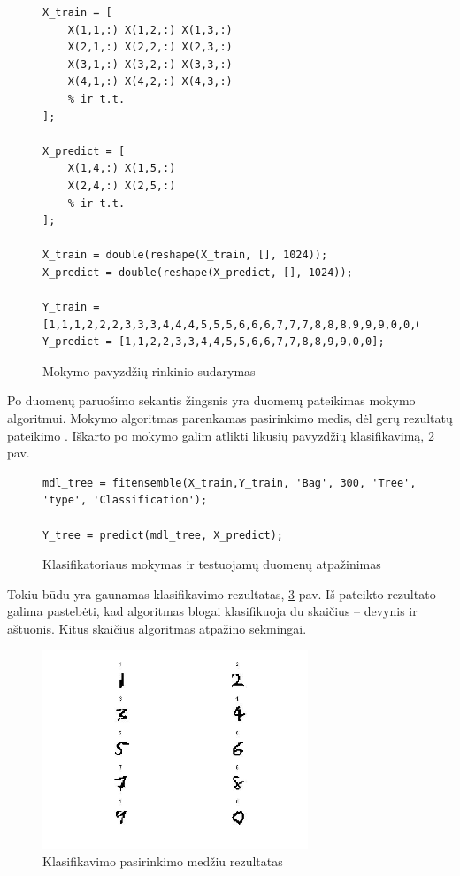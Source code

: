 \documentclass[11pt, a4paper, lithuanian]{article}
\begin{document}
    \begin{figure}[h]
      \centering
      \caption{Mokymo pavyzdžių rinkinio sudarymas}
      \label{code:mokymo_pavyzdziu_rinkinio_sudarymas}
      \begin{lstlisting}
X_train = [
    X(1,1,:) X(1,2,:) X(1,3,:)
    X(2,1,:) X(2,2,:) X(2,3,:)
    X(3,1,:) X(3,2,:) X(3,3,:)
    X(4,1,:) X(4,2,:) X(4,3,:)
    % ir t.t.
];

X_predict = [
    X(1,4,:) X(1,5,:)
    X(2,4,:) X(2,5,:)
    % ir t.t.
];

X_train = double(reshape(X_train, [], 1024));
X_predict = double(reshape(X_predict, [], 1024));

Y_train = [1,1,1,2,2,2,3,3,3,4,4,4,5,5,5,6,6,6,7,7,7,8,8,8,9,9,9,0,0,0];
Y_predict = [1,1,2,2,3,3,4,4,5,5,6,6,7,7,8,8,9,9,0,0];

      \end{lstlisting}
    \end{figure}

    Po duomenų paruošimo sekantis žingsnis yra duomenų pateikimas mokymo algoritmui. Mokymo algoritmas parenkamas pasirinkimo medis, dėl gerų rezultatų pateikimo \cite{matlabexample}. Iškarto po mokymo galim atlikti likusių pavyzdžių klasifikavimą, \ref{code:klasifikatoriaus_mokymas} pav.

    \begin{figure}[h]
      \centering
      \caption{Klasifikatoriaus mokymas ir testuojamų duomenų atpažinimas}
      \label{code:klasifikatoriaus_mokymas}
      \begin{lstlisting}
mdl_tree = fitensemble(X_train,Y_train, 'Bag', 300, 'Tree', 'type', 'Classification');

Y_tree = predict(mdl_tree, X_predict);

      \end{lstlisting}
    \end{figure}

    Tokiu būdu yra gaunamas klasifikavimo rezultatas, \ref{fig:klasifikavimo_pasirinkimo_medziu_rezultatas} pav. Iš pateikto rezultato galima pastebėti, kad algoritmas blogai klasifikuoja du skaičius -- devynis ir aštuonis. Kitus skaičius algoritmas atpažino sėkmingai.

    \begin{figure}[h]
        \centering
        \includegraphics[width=300px]{img/rezultatas.jpg}
        \caption{Klasifikavimo pasirinkimo medžiu rezultatas}
        \label{fig:klasifikavimo_pasirinkimo_medziu_rezultatas}
    \end{figure}
\end{document}
